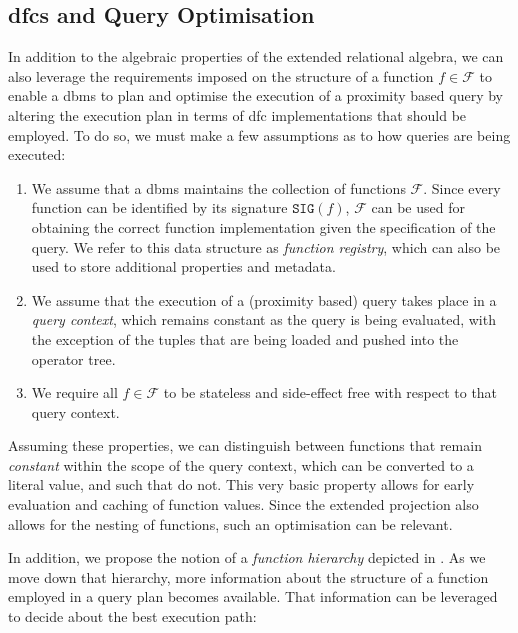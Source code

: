 \subsection{\texorpdfstring{\acrshort{dfc}s}{DFCs} and Query Optimisation}
\label{section:dfc_and_planning}

In addition to the algebraic properties of the extended relational algebra, we can also leverage the requirements imposed on the structure of a function $f \in \mathcal{F}$ to enable a \acrshort{dbms} to plan and optimise the execution of a proximity based query by altering the execution plan in terms of \acrshort{dfc} implementations that should be employed. To do so, we must make a few assumptions as to how queries are being executed: 

\begin{enumerate}
    \item We assume that a \acrshort{dbms} maintains the collection of functions $\mathcal{F}$. Since every function can be identified by its signature $\mathtt{SIG}(f)$, $\mathcal{F}$ can be used for obtaining the correct function implementation given the specification of the query. We refer to this data structure as \emph{function registry}, which can also be used to store additional properties and metadata.
    \item We assume that the execution of a (proximity based) query takes place in a \emph{query context}, which remains constant as the query is being evaluated, with the exception of the tuples that are being loaded and pushed into the operator tree.
    \item We require all $f \in \mathcal{F}$ to be stateless and side-effect free with respect to that query context. 
\end{enumerate}

Assuming these properties, we can distinguish between functions that remain \emph{constant} within the scope of the query context, which can be converted to a literal value, and such that do not. This very basic property allows for early evaluation and caching of function values. Since the extended projection also allows for the nesting of functions, such an optimisation can be relevant.

In addition, we propose the notion of a \emph{function hierarchy} depicted in . As we move down that hierarchy, more information about the structure of a function employed in a query plan becomes available. That information can be leveraged to decide about the best execution path:

